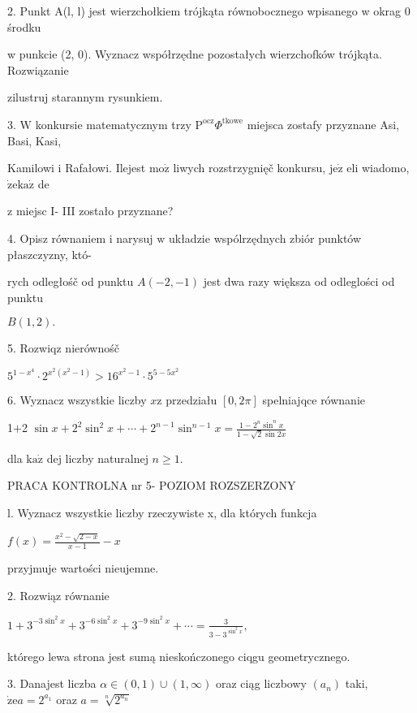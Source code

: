 \documentclass[a4paper,12pt]{article}
\begin{document}
2. Punkt A(l, l) jest wierzchołkiem trójkąta równobocznego wpisanego w okrag 0 środku

w punkcie (2, 0). Wyznacz współrzędne pozostałych wierzchofków trójkąta. Rozwiązanie

zilustruj starannym rysunkiem.

3. $\mathrm{W}$ konkursie matematycznym trzy $\mathrm{P}^{\mathrm{o}\mathrm{c}\mathrm{z}}\Phi^{\mathrm{t}\mathrm{k}\mathrm{o}\mathrm{w}\mathrm{e}}$ miejsca zostafy przyznane Asi, Basi, Kasi,

Kamilowi $\mathrm{i}$ Rafałowi. Ilejest $\mathrm{m}\mathrm{o}\dot{\mathrm{z}}$ liwych rozstrzygnięč konkursu, $\mathrm{j}\mathrm{e}\dot{\mathrm{z}}$ eli wiadomo, $\dot{\mathrm{z}}\mathrm{e}\mathrm{k}\mathrm{a}\dot{\mathrm{z}}$ de

$\mathrm{z}$ miejsc I- III zostało przyznane?

4. Opisz równaniem $\mathrm{i}$ narysuj $\mathrm{w}$ układzie wspólrzędnych zbiór punktów płaszczyzny, któ-

rych odległośč od punktu $A(-2,-1)$ jest dwa razy większa od odleglości od punktu

$B(1,2).$

5. Rozwiqz nierównośč

$5^{1-x^{4}}\cdot 2^{x^{2}(x^{2}-1)}>16^{x^{2}-1}\cdot 5^{5-5x^{2}}$

6. Wyznacz wszystkie liczby $x\mathrm{z}$ przedziału $[0,2\pi]$ spelniajqce równanie

1$+$2 $\displaystyle \sin x+2^{2}\sin^{2}x+\cdots+2^{n-1}\sin^{n-1}x=\frac{1-2^{n}\sin^{n}x}{1-\sqrt{2}\sin 2x}$

dla $\mathrm{k}\mathrm{a}\dot{\mathrm{z}}$ dej liczby naturalnej $n\geq 1.$




PRACA KONTROLNA nr 5- POZIOM ROZSZERZONY

l. Wyznacz wszystkie liczby rzeczywiste x, dla których funkcja

$f(x)=\displaystyle \frac{x^{2}-\sqrt{2-x}}{x-1}-x$

przyjmuje wartości nieujemne.

2. Rozwiąz równanie

$1+3^{-3\sin^{2}x}+3^{-6\sin^{2}x}+3^{-9\sin^{2}x}+\displaystyle \cdots=\frac{3}{3-3^{\sin^{2}x}},$

którego lewa strona jest sumą nieskończonego ciqgu geometrycznego.

3. Danajest liczba $\alpha\in(0,1)\cup(1,\infty)$ oraz ciąg liczbowy $(a_{n})$ taki, $\dot{\mathrm{z}}\mathrm{e}a=2^{a_{1}}$ oraz $a= \sqrt[n]{2^{a_{n}}}$
\end{document}
